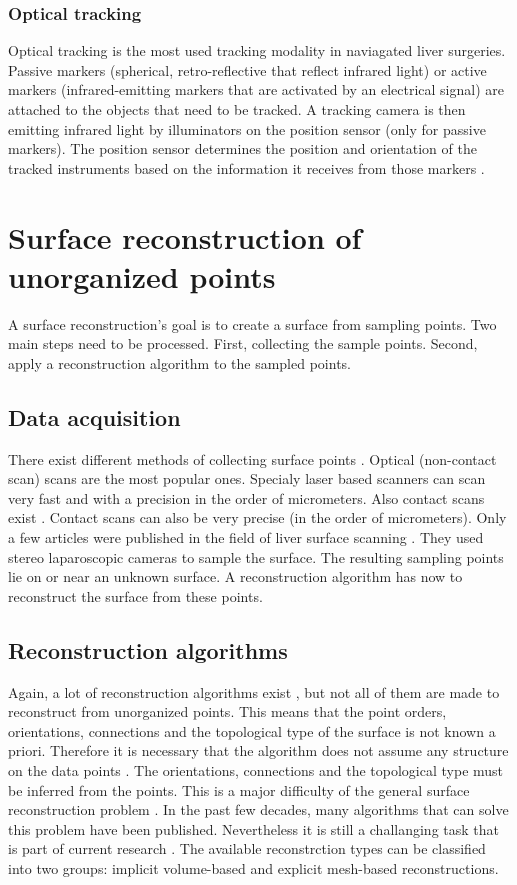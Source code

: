 \subsubsection{Optical tracking}
Optical tracking is the most used tracking modality in naviagated liver
surgeries. Passive markers (spherical, retro-reflective that reflect infrared
light) or active markers (infrared-emitting markers that are activated by an
electrical signal) \cite{wiles2004accuracy} are attached to the objects that
need to be tracked. A tracking camera is then emitting infrared light by illuminators
on the position sensor (only for passive markers). The position sensor
determines the position and orientation of the tracked instruments based on the
information it receives from those markers \cite{noauthor_polaris_nodate}.  

\section{Surface reconstruction of unorganized points}
A surface reconstruction's goal is to create a surface from sampling points. Two
main steps need to be processed. First, collecting the sample points. Second,
apply a reconstruction algorithm to the sampled points.
\subsection{Data acquisition}
There exist different methods of collecting surface points
\cite{franca20053d}\cite{levoy2000digital}\cite{cui20113d}\cite{chu2002infrared}\cite{dou20153d}.
Optical (non-contact scan) scans are the most popular ones. Specialy laser based
scanners can scan very fast and with a precision in the order of micrometers. Also contact scans exist
\cite{pai2001scanning}. Contact scans can also be very precise (in the order of
micrometers).
Only a few articles were published in the field of liver surface scanning \cite{maier2014comparative} \cite{thompson2015accuracy}. 
They used stereo laparoscopic cameras to sample the surface.
The resulting sampling points lie on or near an unknown surface. A
reconstruction algorithm has now to reconstruct the surface from these points.
\subsection{Reconstruction algorithms}
Again, a lot of reconstruction algorithms exist \cite{lim2014surface}, but not
all of them are made to reconstruct from unorganized points. This means
that the point orders, orientations, connections and the topological type of the
surface is not known a priori. Therefore it is necessary that the algorithm does not assume any structure
on the data points \cite{hornung2006robust} \cite{yu1999surface}. The orientations, connections and the topological
type must be inferred from the points. This is a major difficulty of the general surface
reconstruction problem \cite{hoppe1992surface}. In the past few decades, many
algorithms that can solve this problem have been published. Nevertheless it is
still a challanging task that is part of current research \cite{li2018surface}.
The available reconstrction types can be classified into two groups: implicit
volume-based and explicit mesh-based reconstructions.
